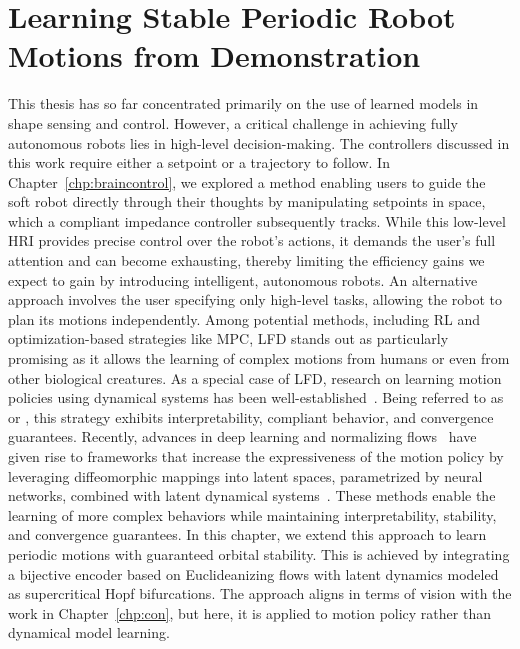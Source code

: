 \chapter{Learning Stable Periodic Robot Motions from Demonstration}
\label{chp:osmp}

\begin{foreword}
    This thesis has so far concentrated primarily on the use of learned models in shape sensing and control. However, a critical challenge in achieving fully autonomous robots lies in high-level decision-making. The controllers discussed in this work require either a setpoint or a trajectory to follow. In Chapter~\ref{chp:braincontrol}, we explored a method enabling users to guide the soft robot directly through their thoughts by manipulating setpoints in space, which a compliant impedance controller subsequently tracks. While this low-level \gls{HRI} provides precise control over the robot’s actions, it demands the user’s full attention and can become exhausting, thereby limiting the efficiency gains we expect to gain by introducing intelligent, autonomous robots.
    An alternative approach involves the user specifying only high-level tasks, allowing the robot to plan its motions independently. Among potential methods, including \gls{RL} and optimization-based strategies like \gls{MPC}, \gls{LFD} stands out as particularly promising as it allows the learning of complex motions from humans or even from other biological creatures. As a special case of \gls{LFD}, research on learning motion policies using dynamical systems has been well-established~\citep {ijspeert2013dynamical}. Being referred to as  or , this strategy exhibits interpretability, compliant behavior, and convergence guarantees. Recently, advances in deep learning and normalizing flows~\citep{kobyzev2020normalizing} have given rise to frameworks that increase the expressiveness of the motion policy by leveraging diffeomorphic mappings into latent spaces, parametrized by neural networks, combined with latent dynamical systems~\citep{rana2020euclideanizing, perez2023stable, zhi2024teaching}. These methods enable the learning of more complex behaviors while maintaining interpretability, stability, and convergence guarantees.
    In this chapter, we extend this approach to learn periodic motions with guaranteed orbital stability. This is achieved by integrating a bijective encoder based on Euclideanizing flows with latent dynamics modeled as supercritical Hopf bifurcations. The approach aligns in terms of vision with the work in Chapter~\ref{chp:con}, but here, it is applied to motion policy rather than dynamical model learning.
\end{foreword}

